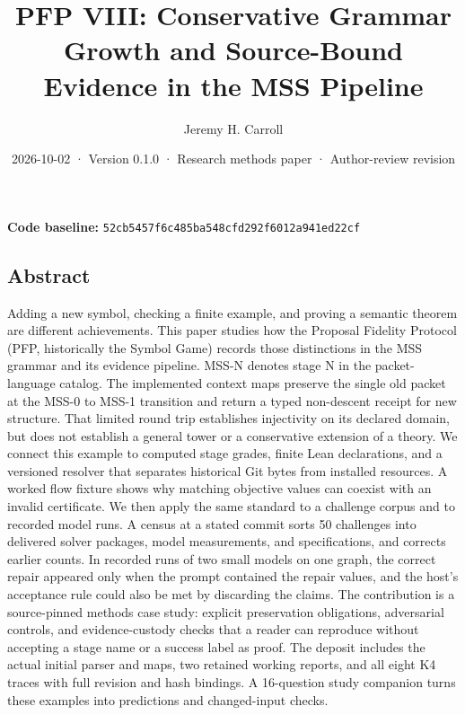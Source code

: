 \documentclass[
  11pt,
]{article}
\title{PFP VIII: Conservative Grammar Growth and Source-Bound Evidence
in the MSS Pipeline}
\author{Jeremy H. Carroll}
\date{2026-10-02 · Version 0.1.0 · Research methods paper ·
Author-review revision}
\begin{document}
\makeatletter
\begin{center}
{\LARGE \@title\par}
\vspace{0.8em}
{\normalsize \@author\par}
\vspace{0.5em}
{\small \@date\par}
\end{center}
\makeatother

\textbf{Code baseline:}
\nolinkurl{52cb5457f6c485ba548cfd292f6012a941ed22cf}

\hypertarget{abstract}{%
\subsection{Abstract}\label{abstract}}

Adding a new symbol, checking a finite example, and proving a semantic
theorem are different achievements. This paper studies how the Proposal
Fidelity Protocol (PFP, historically the Symbol Game) records those
distinctions in the MSS grammar and its evidence pipeline. MSS-N denotes
stage N in the packet-language catalog. The implemented context maps
preserve the single old packet at the MSS-0 to MSS-1 transition and
return a typed non-descent receipt for new structure. That limited round
trip establishes injectivity on its declared domain, but does not
establish a general tower or a conservative extension of a theory. We
connect this example to computed stage grades, finite Lean declarations,
and a versioned resolver that separates historical Git bytes from
installed resources. A worked flow fixture shows why matching objective
values can coexist with an invalid certificate. We then apply the same
standard to a challenge corpus and to recorded model runs. A census at a
stated commit sorts 50 challenges into delivered solver packages, model
measurements, and specifications, and corrects earlier counts. In
recorded runs of two small models on one graph, the correct repair
appeared only when the prompt contained the repair values, and the
host's acceptance rule could also be met by discarding the claims. The
contribution is a source-pinned methods case study: explicit
preservation obligations, adversarial controls, and evidence-custody
checks that a reader can reproduce without accepting a stage name or a
success label as proof. The deposit includes the actual initial parser
and maps, two retained working reports, and all eight K4 traces with
full revision and hash bindings. A 16-question study companion turns
these examples into predictions and changed-input checks.
\end{document}

